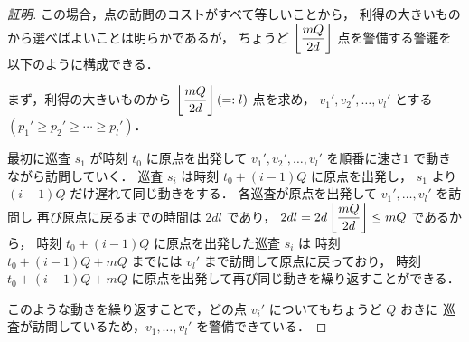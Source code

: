 \begin{proof}[証明]
この場合，点の訪問のコストがすべて等しいことから，
利得の大きいものから選べばよいことは明らかであるが，
ちょうど $\left\lfloor{\dfrac{mQ}{2d}}\right\rfloor$ 点を警備する警邏を以下のように構成できる．

まず，利得の大きいものから $\left\lfloor{\dfrac{mQ}{2d}}\right\rfloor (=: l)$ 点を求め，
$v_1', v_2', \ldots, v_l'$ とする 
$(p_1' \geq p_2' \geq \cdots \geq p_l')$．

最初に巡査 $s_1$ が時刻 $t_0$ に原点を出発して
$v_1', v_2', \ldots, v_l'$ を順番に速さ$1$ で動きながら訪問していく．
巡査 $s_i$ は時刻 $t_0 + (i - 1)Q$ に原点を出発し，
$s_1$ より $(i - 1)Q$ だけ遅れて同じ動きをする．
各巡査が原点を出発して $v_1', \ldots, v_l'$ を訪問し
再び原点に戻るまでの時間は $2dl$ であり，
$2dl = 2d \left\lfloor{\dfrac{mQ}{2d}}\right\rfloor \leq mQ$ であるから，
時刻 $t_0 + (i - 1)Q$ に原点を出発した巡査 $s_i$ は
時刻 $t_0 + (i - 1)Q + mQ$ までには $v_l'$ まで訪問して原点に戻っており，
時刻 $t_0 + (i - 1)Q + mQ$ に原点を出発して再び同じ動きを繰り返すことができる．

このような動きを繰り返すことで，どの点 $v_i'$ についてもちょうど $Q$ おきに
巡査が訪問しているため，$v_1, \ldots, v_l'$ を警備できている．


\end{proof}
